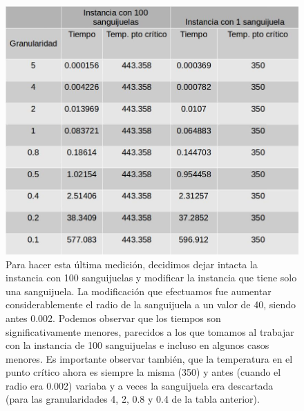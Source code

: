 \begin{figure}[H]
\centering
\includegraphics[scale=0.4]{../../Experimentos/Experimento2/instancias40x40_2.jpg}\caption{Para hacer esta última medición, decidimos dejar intacta la instancia con 100 sanguijuelas y modificar la instancia que tiene solo una sanguijuela. La modificación que efectuamos fue aumentar considerablemente el radio de la sanguijuela a un valor de 40, siendo antes 0.002. Podemos observar que los tiempos son significativamente menores, parecidos a los que tomamos al trabajar con la instancia de 100 sanguijuelas e incluso en algunos casos menores. Es importante observar también, que la temperatura en el punto crítico ahora es siempre la misma (350) y antes (cuando el radio era 0.002) variaba y a veces la sanguijuela era descartada (para las granularidades 4, 2, 0.8 y 0.4 de la tabla anterior).}
\end{figure}